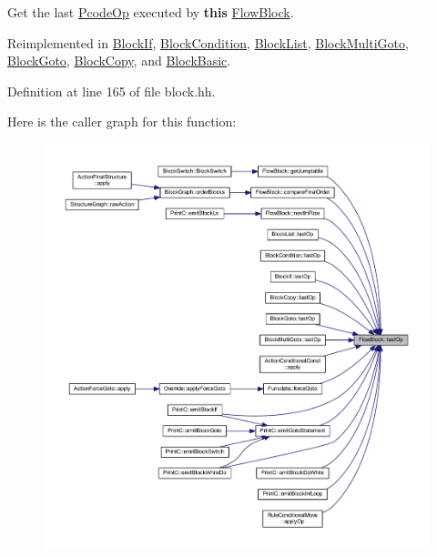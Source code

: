 Get the last \mbox{\hyperlink{class_pcode_op}{Pcode\+Op}} executed by {\bfseries{this}} \mbox{\hyperlink{class_flow_block}{Flow\+Block}}. 



Reimplemented in \mbox{\hyperlink{class_block_if_a94053e78df44aef0ee7a225dc4f3a5a5}{Block\+If}}, \mbox{\hyperlink{class_block_condition_acfde1060a17a2c40b1cb9edf90e69595}{Block\+Condition}}, \mbox{\hyperlink{class_block_list_acd80d60a0cb7257e4ada35f62c6ddb91}{Block\+List}}, \mbox{\hyperlink{class_block_multi_goto_a70cc69b1b4835ae574cebbbf13b868bd}{Block\+Multi\+Goto}}, \mbox{\hyperlink{class_block_goto_a1989016995f57acf0da08f1318a75d43}{Block\+Goto}}, \mbox{\hyperlink{class_block_copy_ab07a0819d0e6527dd08240f09400c7d6}{Block\+Copy}}, and \mbox{\hyperlink{class_block_basic_a42c5313d7980138d098e184b249b6415}{Block\+Basic}}.



Definition at line 165 of file block.\+hh.

Here is the caller graph for this function\+:
\nopagebreak
\begin{figure}[H]
\begin{center}
\leavevmode
\includegraphics[width=350pt]{class_flow_block_a5db2a7d4baa2070ebf3151b13fd16d09_icgraph}
\end{center}
\end{figure}
\mbox{\label{class_flow_block_a0882ce85a017e4988eda779de6a86089}} 
